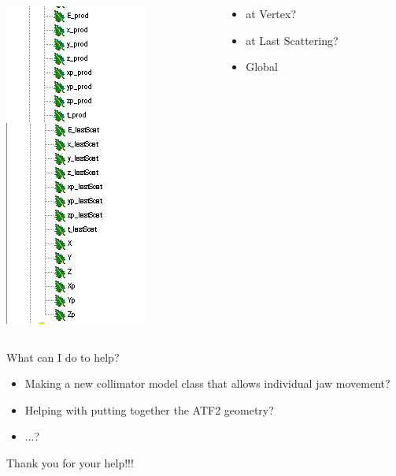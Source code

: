 \documentclass[xcolor={dvipsnames}]{beamer}
\begin{document}
\begin{frame}
\begin{columns}
 \begin{column}[c]{0.2\textwidth}
 \centering
\includegraphics[height=0.5\textheight]{figures/ROOT_Tree2.png}
 \end{column}
  \begin{column}[c]{0.4\textwidth}
\begin{itemize}
 \item at Vertex?\\
 \vspace*{0.8cm}
 \item at Last Scattering?\\
  \vspace*{0.8cm}
 \item Global
\end{itemize}
 \end{column}

 \end{columns}

\end{frame}

\begin{frame}
 What can I do to help?
 \begin{itemize}
 \item Making a new collimator model class that allows individual jaw movement?
 \item Helping with putting together the ATF2 geometry?
 \item ...?
\end{itemize}
\vspace*{1cm}
\LARGE{Thank you for your help!!!}
\end{frame}
\end{document}

